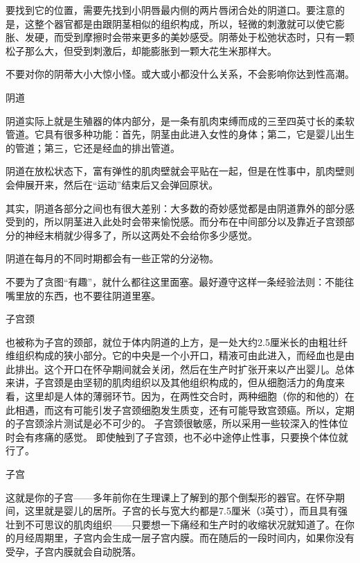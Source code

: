 \documentclass[12pt,UTF8]{ctexbook}
\begin{document}
要找到它的位置，需要先找到小阴唇最内侧的两片唇闭合处的阴道口。要注意的是，这整个器官都是由跟阴茎相似的组织构成，所以，轻微的刺激就可以使它膨胀、发硬，而受到摩擦时会带来更多的美妙感受。阴蒂处于松弛状态时，只有一颗松子那么大，但受到刺激后，却能膨胀到一颗大花生米那样大。

不要对你的阴蒂大小大惊小怪。或大或小都没什么关系，不会影响你达到性高潮。

阴道

阴道实际上就是生殖器的体内部分，是一条有肌肉束缚而成的三至四英寸长的柔软管道。它具有很多种功能：首先，阴茎由此进入女性的身体；第二，它是婴儿出生的管道；第三，它还是经血的排出管道。

阴道在放松状态下，富有弹性的肌肉壁就会平贴在一起，但是在性事中，肌肉壁则会伸展开来，然后在“运动”结束后又会弹回原状。

其实，阴道各部分之间也有很大差别：大多数的奇妙感觉都是由阴道靠外的部分感受到的，所以阴茎进入此处时会带来愉悦感。而分布在中间部分以及靠近子宫颈部分的神经末梢就少得多了，所以这两处不会给你多少感觉。

阴道在每月的不同时期都会有一些正常的分泌物。

不要为了贪图“有趣”，就什么都往这里面塞。最好遵守这样一条经验法则：不能往嘴里放的东西，也不要往阴道里塞。

子宫颈

也被称为子宫的颈部，就位于体内阴道的上方，是一处大约2.5厘米长的由粗壮纤维组织构成的狭小部分。它的中央是一个小开口，精液可由此进入，而经血也是由此排出。这个开口在怀孕期间就会关闭，然后在生产时扩张开来以产出婴儿。总体来讲，子宫颈是由坚韧的肌肉组织以及其他组织构成的，但从细胞活力的角度来看，这里却是人体的薄弱环节。因为，在两性交合时，两种细胞（你的和他的）在此相遇，而这有可能引发子宫颈细胞发生质变，还有可能导致宫颈癌。所以，定期的子宫颈涂片测试是必不可少的。
子宫颈很敏感，所以采用一些较深入的性体位时会有疼痛的感觉。
即使触到了子宫颈，也不必中途停止性事，只要换个体位就行了。

子宫

这就是你的子宫——多年前你在生理课上了解到的那个倒梨形的器官。在怀孕期间，这里就是婴儿的居所。子宫的长与宽大约都是7.5厘米（3英寸），而且具有强壮到不可思议的肌肉组织——只要想一下痛经和生产时的收缩状况就知道了。在你的月经周期里，子宫内会生成一层子宫内膜。而在随后的一段时间内，如果你没有受孕，子宫内膜就会自动脱落。
\end{document}
